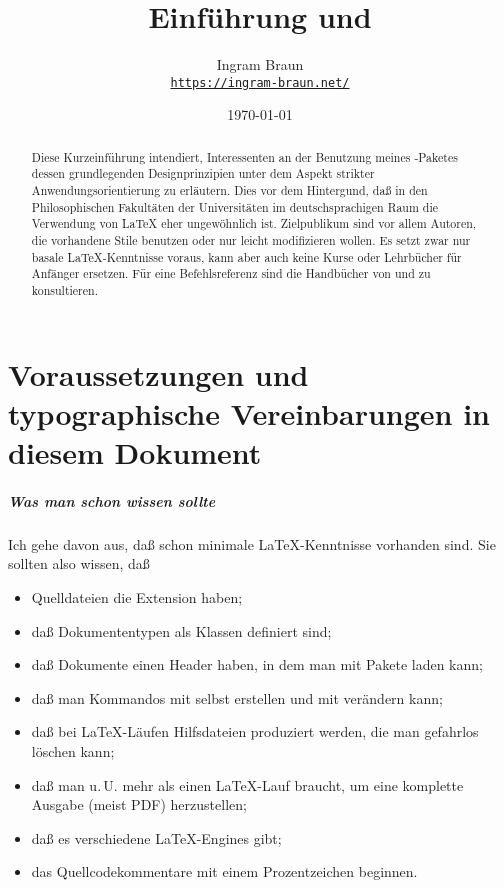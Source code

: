 \documentclass[12pt,table]{scrreprt}
\title{Einführung \blx und \archbib [v2.3]}
\author{Ingram Braun\\\href{https://ingram-braun.net/}{\texttt{https://ingram-braun.net/}}}
\date{\today}
\begin{document}
\DefineShortVerb{\|} %

\maketitle

\begin{abstract}\noindent
Diese Kurzeinführung intendiert, Interessenten an der Benutzung meines \archbib-Paketes dessen grundlegenden Designprinzipien unter dem Aspekt strikter Anwendungsorientierung zu erläutern. Dies vor dem Hintergund, daß in den Philosophischen Fakultäten der Universitäten im deutschsprachigen Raum die Verwendung von \LaTeX{} eher ungewöhnlich ist. Zielpublikum sind vor allem Autoren, die vorhandene Stile benutzen oder nur leicht modifizieren wollen. Es setzt zwar nur basale \LaTeX{}-Kenntnisse voraus, kann aber auch keine Kurse oder Lehrbücher für Anfänger ersetzen. Für eine Befehlsreferenz sind die Handbücher von \blx und \archbib zu konsultieren.
\end{abstract}
 
\tableofcontents

\chapter{Voraussetzungen und typographische Vereinbarungen in diesem Dokument}

\paragraph{Was man schon wissen sollte}
Ich gehe davon aus, daß schon minimale \LaTeX-Kenntnisse vorhanden sind. Sie sollten also wissen, daß
\begin{itemize}
\item Quelldateien die Extension  haben;
\item daß Dokumententypen als Klassen definiert sind;
\item daß Dokumente einen Header haben, in dem man mit  Pakete laden kann;
\item daß man Kommandos mit  selbst erstellen und mit  verändern kann;
\item daß bei \LaTeX-Läufen Hilfsdateien produziert werden, die man gefahrlos löschen kann;
\item daß man u.\,U. mehr als einen \LaTeX-Lauf braucht, um eine komplette Ausgabe (meist PDF) herzustellen;
\item daß es verschiedene \LaTeX-Engines gibt;
\item das Quellcodekommentare mit einem Prozentzeichen beginnen.
\end{itemize}
\end{document}
